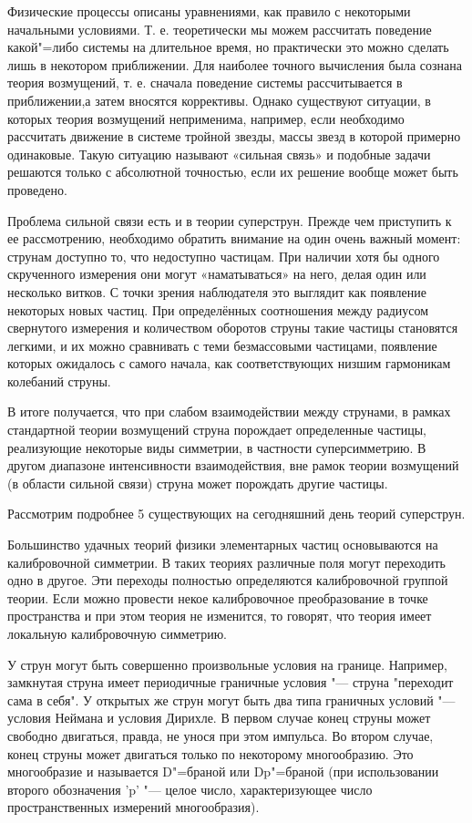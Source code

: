 Физические процессы описаны уравнениями, как правило с некоторыми начальными условиями.
Т. е. теоретически мы можем рассчитать поведение какой"=либо системы на длительное время,
но практически это можно сделать лишь в некотором приближении.
Для наиболее точного вычисления была сознана теория возмущений,
т. е. сначала поведение системы рассчитывается в приближении,а затем вносятся коррективы.
Однако существуют ситуации, в которых теория возмущений неприменима,
например, если необходимо рассчитать движение в системе тройной звезды,
массы звезд в которой примерно одинаковые.
Такую ситуацию называют «сильная связь» и подобные задачи решаются только с абсолютной точностью,
если их решение вообще может быть проведено. 

Проблема сильной связи есть и в теории суперструн. Прежде чем приступить к ее рассмотрению, необходимо обратить внимание на один очень важный момент: струнам доступно то, что недоступно частицам.
При наличии хотя бы одного скрученного измерения они могут «наматываться» на него, делая один или несколько витков.
С точки зрения наблюдателя это выглядит как появление некоторых новых частиц.
При определённых соотношения между радиусом свернутого измерения и количеством оборотов струны такие частицы становятся легкими,
и их можно сравнивать с теми безмассовыми частицами, появление которых ожидалось с самого начала,
как соответствующих низшим гармоникам колебаний струны.

В итоге получается, что при слабом взаимодействии между струнами,
в рамках стандартной теории возмущений струна порождает определенные частицы,
реализующие некоторые виды симметрии, в частности суперсимметрию.
В другом диапазоне интенсивности взаимодействия,
вне рамок теории возмущений (в области сильной связи)
струна может порождать другие частицы.

Рассмотрим подробнее 5 существующих на сегодняшний день теорий суперструн.

Большинство удачных теорий физики элементарных частиц основываются на калибровочной симметрии.
В таких теориях различные поля могут переходить одно в другое.
Эти переходы полностью определяются калибровочной группой теории.
Если можно провести некое калибровочное преобразование в точке пространства и при этом теория не изменится,
то говорят, что теория имеет локальную калибровочную симметрию.

У струн могут быть совершенно произвольные условия на границе.
Например, замкнутая струна имеет периодичные граничные условия "--- струна "переходит сама в себя".
У открытых же струн могут быть два типа граничных условий "--- условия Неймана и условия Дирихле.
В первом случае конец струны может свободно двигаться, правда, не унося при этом импульса.
Во втором  случае, конец струны может двигаться только по некоторому многообразию.
Это многообразие и называется D"=браной или Dp"=браной
(при использовании второго обозначения 'p' "--- целое число,
характеризующее число пространственных измерений многообразия).

